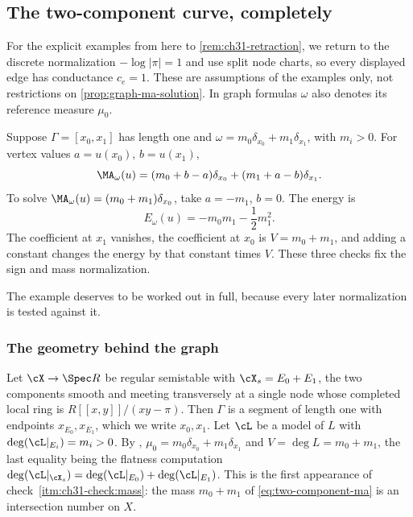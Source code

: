 \subsection{The two-component curve, completely}
\label{sec:ch31-two-component}

For the explicit examples from here to \cref{rem:ch31-retraction},
we return to the discrete normalization \(-\log|\pi|=1\) and use
split node charts, so every displayed edge has conductance \(c_e=1\).
These are assumptions of the examples only, not restrictions on
\cref{prop:graph-ma-solution}.
In graph formulas \(\omega\) also denotes its reference measure \(\mu_0\).

\begin{example}
\label{ex:two-component-complete}
Suppose \(\Gamma=[x_0,x_1]\) has length one and
\(\omega=m_0\delta_{x_0}+m_1\delta_{x_1}\), with \(m_i>0\).  For vertex
values \(a=u(x_0)\), \(b=u(x_1)\),
\begin{equation}
 \MA_\omega(u)
 =(m_0+b-a)\delta_{x_0}+(m_1+a-b)\delta_{x_1}.
\label{eq:two-component-ma}
\end{equation}
To solve \(\MA_\omega(u)=(m_0+m_1)\delta_{x_0}\), take
\(a=-m_1\), \(b=0\).  The energy is
\begin{equation}
 E_\omega(u)
 =-m_0m_1-\frac12m_1^2.
\label{eq:two-component-energy}
\end{equation}
The coefficient at \(x_1\) vanishes, the coefficient at \(x_0\) is
\(V=m_0+m_1\), and adding a constant changes the energy by that constant
times \(V\).  These three checks fix the sign and mass normalization.
\end{example}

The example deserves to be worked out in full, because every later
normalization is tested against it.

\subsubsection*{The geometry behind the graph}

Let \(\cX\to\Spec R\) be regular semistable with
\(\cX_s=E_0+E_1\), the two components smooth and meeting transversely at a
single node whose completed local ring is \(R[[x,y]]/(xy-\pi)\).  Then
\(\Gamma\) is a segment of length one with endpoints \(x_{E_0},x_{E_1}\),
which we write \(x_0,x_1\).  Let \(\cL\) be a model of \(L\) with
\(\deg(\cL|_{E_i})=m_i>0\).  By ,
\(\mu_0=m_0\delta_{x_0}+m_1\delta_{x_1}\) and
\(V=\deg L=m_0+m_1\), the last equality being the flatness computation
\(\deg(\cL|_{\cX_s})=\deg(\cL|_{E_0})+\deg(\cL|_{E_1})\).  This is the
first appearance of check~\cref{itm:ch31-check:mass}: the mass \(m_0+m_1\)
of \eqref{eq:two-component-ma} is an intersection number on \(X\).

